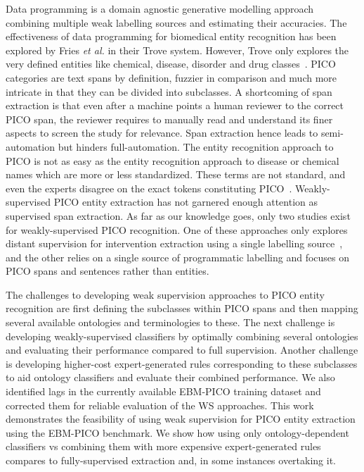 \documentclass[10.7pt,]{article}
\begin{document}
Data programming is a domain agnostic generative modelling approach combining multiple weak labelling sources and estimating their accuracies.
The effectiveness of data programming for biomedical entity recognition has been explored by Fries \textit{et al.} in their Trove system.
However, Trove only explores the very defined entities like chemical, disease, disorder and drug classes~\cite{fries2021ontology}. 
PICO categories are text spans by definition, fuzzier in comparison and much more intricate in that they can be divided into subclasses.
A shortcoming of span extraction is that even after a machine points a human reviewer to the correct PICO span, the reviewer requires to manually read and understand its finer aspects to screen the study for relevance.
Span extraction hence leads to semi-automation but hinders full-automation.
The entity recognition approach to PICO is not as easy as the entity recognition approach to disease or chemical names which are more or less standardized.
These terms are not standard, and even the experts disagree on the exact tokens constituting PICO~\cite{brockmeier2019improving}.
Weakly-supervised PICO entity extraction has not garnered enough attention as supervised span extraction.
As far as our knowledge goes, only two studies exist for weakly-supervised PICO recognition.
One of these approaches only explores distant supervision for intervention extraction using a single labelling source~\cite{dhrangadhariya2022distant}, and the other relies on a single source of programmatic labelling and focuses on PICO spans and sentences rather than entities.



The challenges to developing weak supervision approaches to PICO entity recognition are first defining the subclasses within PICO spans and then mapping several available ontologies and terminologies to these.
The next challenge is developing weakly-supervised classifiers by optimally combining several ontologies and evaluating their performance compared to full supervision.
Another challenge is developing higher-cost expert-generated rules corresponding to these subclasses to aid ontology classifiers and evaluate their combined performance.
We also identified lags in the currently available EBM-PICO training dataset and corrected them for reliable evaluation of the WS approaches.
This work demonstrates the feasibility of using weak supervision for PICO entity extraction using the EBM-PICO benchmark.
We show how using only ontology-dependent classifiers vs combining them with more expensive expert-generated rules compares to fully-supervised extraction and, in some instances overtaking it.
%
%
%
\end{document}
